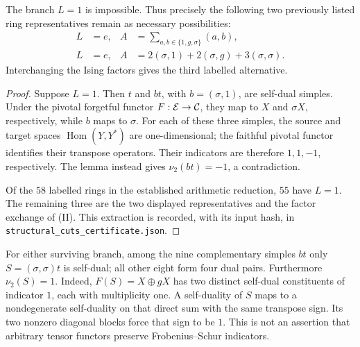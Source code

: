 \documentclass[11pt]{article}
\begin{document}
\begin{proposition}
The branch $L=1$ is impossible. Thus precisely the following two
previously listed ring representatives remain as necessary possibilities:
\begin{align*}
 L&=e,& A&=\sum_{a,b\in\{1,g,\sigma\}}(a,b),\tag{I}\\
 L&=e,& A&=2(\sigma,1)+2(\sigma,g)+3(\sigma,\sigma).\tag{II}
\end{align*}
Interchanging the Ising factors gives the third labelled alternative.
\end{proposition}
\begin{proof}
Suppose $L=1$. Then $t$ and $bt$, with $b=(\sigma,1)$, are self-dual
simples. Under the pivotal forgetful functor $F:\mathcal E\to\mathcal C$, they map to
$X$ and $\sigma X$, respectively, while $b$ maps to $\sigma$.
For each of these three simples, the source and target spaces
$\operatorname{Hom}(Y,Y^*)$ are one-dimensional; the faithful pivotal
functor identifies their transpose operators. Their indicators are
therefore $1,1,-1$, respectively. The lemma instead gives
$\nu_2(bt)=-1$, a contradiction.

Of the $58$ labelled rings in the established arithmetic reduction,
$55$ have $L=1$. The remaining three are the two displayed representatives
and the factor exchange of (II). This extraction is recorded, with
its input hash, in \texttt{structural\_cuts\_certificate.json}.
\end{proof}

For either surviving branch, among the nine complementary simples
$bt$ only $S=(\sigma,\sigma)t$ is self-dual; all other eight form four
dual pairs. Furthermore $\nu_2(S)=1$. Indeed,
$F(S)=X\oplus gX$ has two distinct self-dual constituents of indicator
$1$, each with multiplicity one. A self-duality of $S$ maps to a
nondegenerate self-duality on that direct sum with the same transpose
sign. Its two nonzero diagonal blocks force that sign to be $1$.
This is not an assertion that arbitrary tensor functors preserve
Frobenius--Schur indicators.
\end{document}

